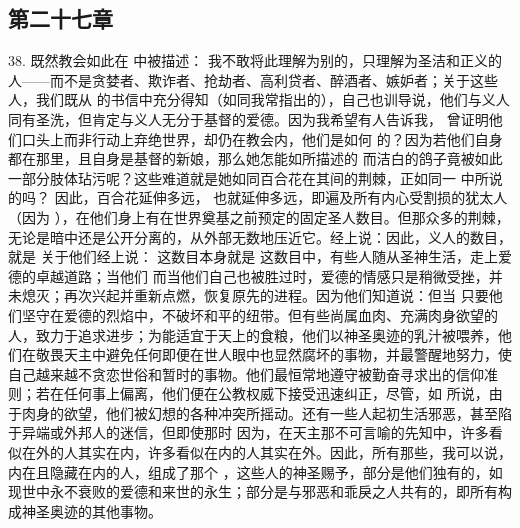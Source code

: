 
\subsection{第二十七章}

38. 既然教会如此在  中被描述： 我不敢将此理解为别的，只理解为圣洁和正义的人——而不是贪婪者、欺诈者、抢劫者、高利贷者、醉酒者、嫉妒者；关于这些人，我们既从  的书信中充分得知（如同我常指出的），自己也训导说，他们与义人同有圣洗，但肯定与义人无分于基督的爱德。因为我希望有人告诉我， 曾证明他们口头上而非行动上弃绝世界，却仍在教会内，他们是如何  的？因为若他们自身都在那里，且自身是基督的新娘，那么她怎能如所描述的  而洁白的鸽子竟被如此一部分肢体玷污呢？这些难道就是她如同百合花在其间的荆棘，正如同一  中所说的吗？ 因此，百合花延伸多远， 也就延伸多远，即遍及所有内心受割损的犹太人（因为 ），在他们身上有在世界奠基之前预定的固定圣人数目。但那众多的荆棘，无论是暗中还是公开分离的，从外部无数地压近它。经上说：因此，义人的数目，就是  关于他们经上说： 这数目本身就是 这数目中，有些人随从圣神生活，走上爱德的卓越道路；当他们  而当他们自己也被胜过时，爱德的情感只是稍微受挫，并未熄灭；再次兴起并重新点燃，恢复原先的进程。因为他们知道说：但当  只要他们坚守在爱德的烈焰中，不破坏和平的纽带。但有些尚属血肉、充满肉身欲望的人，致力于追求进步；为能适宜于天上的食粮，他们以神圣奥迹的乳汁被喂养，他们在敬畏天主中避免任何即便在世人眼中也显然腐坏的事物，并最警醒地努力，使自己越来越不贪恋世俗和暂时的事物。他们最恒常地遵守被勤奋寻求出的信仰准则；若在任何事上偏离，他们便在公教权威下接受迅速纠正，尽管，如  所说，由于肉身的欲望，他们被幻想的各种冲突所摇动。还有一些人起初生活邪恶，甚至陷于异端或外邦人的迷信，但即使那时 因为，在天主那不可言喻的先知中，许多看似在外的人其实在内，许多看似在内的人其实在外。因此，所有那些，我可以说，内在且隐藏在内的人，组成了那个 ，这些人的神圣赐予，部分是他们独有的，如现世中永不衰败的爱德和来世的永生；部分是与邪恶和乖戾之人共有的，即所有构成神圣奥迹的其他事物。\par

